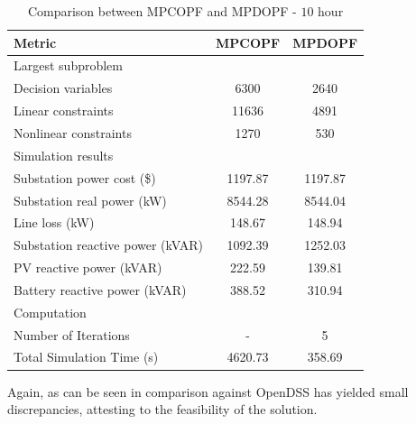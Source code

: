 \documentclass[../../outputs/main.tex]{subfiles}
\begin{document}
\begin{table}[H]
    \centering
    \caption{Comparison between MPCOPF and MPDOPF - $10$ hour}
    \begin{tabular}{|l|c|c|}
    \hline
    \textbf{Metric} & \textbf{MPCOPF} & \textbf{MPDOPF} \\ \hline
    Largest subproblem & \multicolumn{2}{c|}{} \\ \hline
    \quad Decision variables & {6300} & {2640} \\ \hline
    \quad Linear constraints & {11636} & {4891} \\ \hline
    \quad Nonlinear constraints & {1270} & {530} \\ \hline
    Simulation results  & \multicolumn{2}{c|}{} \\ \hline
    \quad Substation power cost (\$) & 1197.87 & 1197.87 \\ \hline
    \quad Substation real power (kW) & 8544.28 & 8544.04 \\ \hline
    \quad Line loss (kW) & 148.67 & 148.94 \\ \hline
    \quad Substation reactive power (kVAR) & 1092.39 & 1252.03 \\ \hline
    \quad PV reactive power (kVAR) & 222.59 & 139.81 \\ \hline
    \quad Battery reactive power (kVAR) & 388.52 & 310.94 \\ \hline
    Computation  & \multicolumn{2}{c|}{} \\ \hline
    \quad Number of Iterations & - & 5 \\ \hline
    \quad Total Simulation Time (s) & 4620.73 & 358.69 \\ \hline
    \end{tabular}
    \label{table:opt-10-20-30}
\end{table}

Again, as can be seen in  comparison against OpenDSS has yielded small discrepancies, attesting to the feasibility of the solution. 
\end{document}
